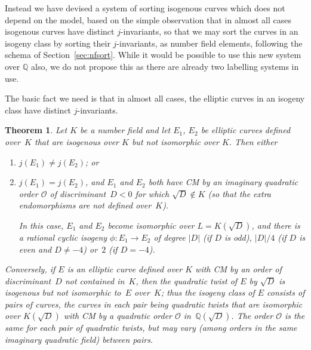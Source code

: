 \documentclass{article}
\newtheorem{thm}{Theorem}[section]
\theoremstyle{remark}
\def\Q{{\mathbb Q}}
\def\OO{{\mathcal O}}
\begin{document}
Instead we have devised a system of sorting isogenous curves which
does not depend on the model, based on the simple observation that in
almost all cases isogenous curves have distinct $j$-invariants, so
that we may sort the curves in an isogeny class by sorting their
$j$-invariants, as number field elements, following the schema of
Section~\ref{sec:nfsort}.  While it would be possible to use this new
system over $\Q$ also, we do not propose this as there are already two
labelling systems in use.

The basic fact we need is that in almost all cases, the elliptic
curves in an isogeny class have distinct $j$-invariants.

\begin{thm}
Let $K$ be a number field and let $E_1$, $E_2$ be elliptic curves
defined over~$K$ that are isogenous over $K$ but not isomorphic over
$K$.  Then either
\begin{enumerate}
\item $j(E_1)\not=j(E_2)$; or
\item $j(E_1)=j(E_2)$, and $E_1$ and $E_2$ both have CM by an
  imaginary quadratic order $\OO$ of discriminant~$D<0$ for which
  $\sqrt{D}\notin K$ (so that the extra endomorphisms are not defined
  over~$K$).

  In this case, $E_1$ and $E_2$ become isomorphic over
  $L=K(\sqrt{D})$, and there is a rational cyclic isogeny $\phi\colon
  E_1\to E_2$ of degree $|D|$ (if $D$ is odd), $|D|/4$ (if $D$ is even
  and $D\not=-4$) or~$2$ (if $D=-4$).
\end{enumerate}
Conversely, if $E$ is an elliptic curve defined over $K$ with CM by an
order of discriminant~$D$ not contained in~$K$, then the quadratic
twist of $E$ by $\sqrt{D}$ is isogenous but not isomorphic to~$E$
over~$K$; thus the isogeny class of $E$ consists of pairs of curves,
the curves in each pair being quadratic twists that are isomorphic
over $K(\sqrt{D})$ with CM by a quadratic order $\OO$
in~$\Q(\sqrt{D})$. The order $\OO$ is the same for each pair of
quadratic twists, but may vary (among orders in the same imaginary
quadratic field) between pairs.
\end{thm}
\end{document}
